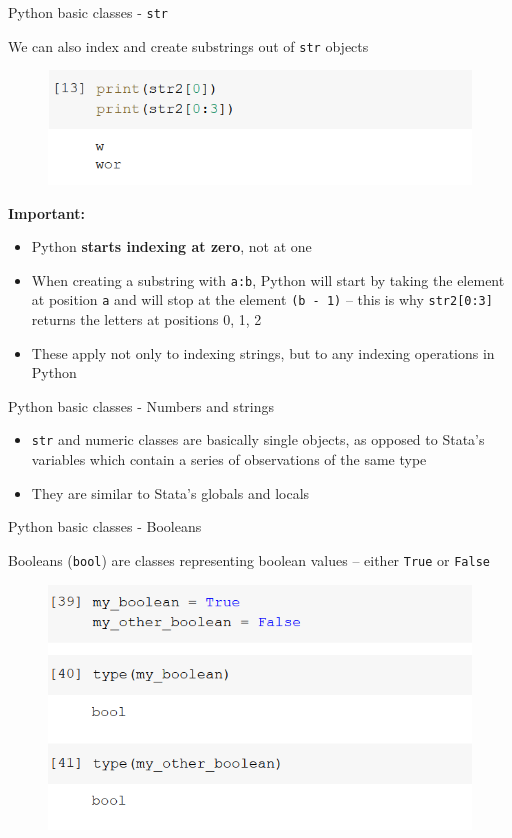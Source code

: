 \documentclass[aspectratio=169]{beamer}
\begin{document}
\begin{frame}{Python basic classes - \texttt{str}}

	We can also index and create substrings out of \texttt{str} objects

	\begin{figure}
		\centering
		\includegraphics[width=0.6\linewidth]{img/string_indexing.png}
	\end{figure}

	\textbf{Important:}

	\begin{itemize}
		\item Python \textbf{starts indexing at zero}, not at one
		\item When creating a substring with \texttt{a:b}, Python will start by taking the element at position \texttt{a} and will stop at the element \texttt{(b - 1)} -- this is why \texttt{str2[0:3]} returns the letters at positions 0, 1, 2
		\item These apply not only to indexing strings, but to any indexing operations in Python  
	\end{itemize}

\end{frame}

\begin{frame}{Python basic classes - Numbers and strings}

	\begin{itemize}
		\item \texttt{str} and numeric classes are basically single objects, as opposed to Stata's variables which contain a series of observations of the same type
		\item They are similar to Stata's globals and locals
	\end{itemize}

\end{frame}

\begin{frame}{Python basic classes - Booleans}

	Booleans (\texttt{bool}) are classes representing boolean values -- either \texttt{True} or \texttt{False}

	\begin{figure}
		\centering
		\includegraphics[width=0.6\linewidth]{img/bool.png}
	\end{figure}

\end{frame}
\end{document}
